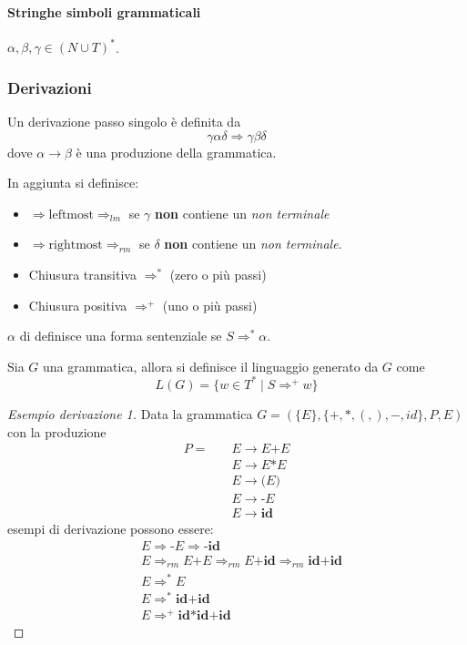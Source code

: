 \paragraph{Stringhe simboli grammaticali}
$\alpha,\beta,\gamma \in (N{\cup}T)^*$.

\subsubsection{Derivazioni}
\label{sec:derivazioni}
\begin{definition}
Un derivazione passo singolo è definita da
$$\gamma\alpha\delta \Rightarrow \gamma\beta\delta$$
dove $\alpha\to\beta$ è una produzione della grammatica.
\end{definition}

In aggiunta si definisce:
\begin{itemize}
\item $\Rightarrow \text{leftmost} \Rightarrow_{lm}$ se $\gamma$ \textbf{non}
contiene un \textit{non terminale}
\item $\Rightarrow \text{rightmost} \Rightarrow_{rm}$ se $\delta$ \textbf{non}
contiene un \textit{non terminale}.
\item Chiusura transitiva $\Rightarrow^*$ (zero o più passi)
\item Chiusura positiva $\Rightarrow^+$ (uno o più passi)
\end{itemize}

\begin{definition}
$\alpha$ di definisce una forma sentenziale se $S \Rightarrow^* \alpha$.
\end{definition}

\begin{definition}
Sia $G$ una grammatica, allora si definisce il linguaggio generato da $G$ come
$$L(G)=\{w \in T^* \mid S \Rightarrow^+ w\}$$
\end{definition}

\begin{proof}[Esempio derivazione 1]
Data la grammatica $G=(\{E\},\{+,*,(,),-,id\},P,E)$ con la produzione
\begin{align*}
P = \quad
& E \to E \textbf{+} E \\
& E \to E \textbf{*} E \\
& E \to \textbf{(}E\textbf{)} \\
& E \to \textbf{-} E \\
& E \to \textbf{id}
\end{align*}
esempi di derivazione possono essere:
\begin{align}
& E \Rightarrow \textbf{-} E \Rightarrow \textbf{-id} \\
& E \Rightarrow_{rm} E \textbf{+} E \Rightarrow_{rm} E \textbf{+id}
\Rightarrow_{rm} \textbf{id+id} \\
& E \Rightarrow^* E \\
& E \Rightarrow^* \textbf{id+id} \\
& E \Rightarrow^+ \textbf{id*id+id}
\end{align}
\end{proof}

